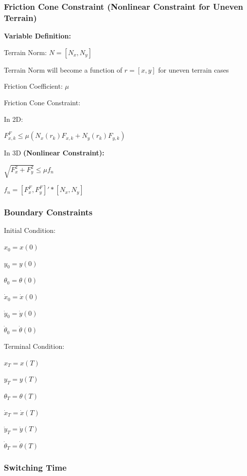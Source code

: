 \documentclass[a4paper,10pt]{article}
\begin{document}
\subsubsection{Friction Cone Constraint (Nonlinear Constraint for Uneven Terrain)}

\textbf{Variable Definition:}

Terrain Norm: $N = [N_x, N_y]$

Terrain Norm will become a function of $r = [x,y]$ for uneven terrain cases

Friction Coefficient: $\mu$

\vspace{3mm}

Friction Cone Constraint:

In 2D:

$F^F_{x,k} \leq \mu(N_x(r_k)F_{x,k} + N_y(r_k)F_{y,k})$

In 3D \textbf{(Nonlinear Constraint):}

$\sqrt{F^2_x + F^2_y} \leq \mu f_n$

$f_n = [F^F_x,F^F_y]'*[N_x,N_y]$



\subsubsection{Boundary Constraints}

Initial Condition: 

$x_0 = x(0)$

$y_0 = y(0)$

$\theta_0 = \theta(0)$

$\dot{x}_0 = \dot{x}(0)$

$\dot{y}_0 = \dot{y}(0)$

$\dot{\theta}_0 = \dot{\theta}(0)$

\vspace{2mm}

Terminal Condition:

$x_T = x(T)$

$y_T = y(T)$

$\theta_T = \theta(T)$

$\dot{x}_T = \dot{x}(T)$

$\dot{y}_T = \dot{y}(T)$

$\dot{\theta}_T = \dot{\theta}(T)$

\vspace{3mm}

\subsubsection{Switching Time}
\end{document}
